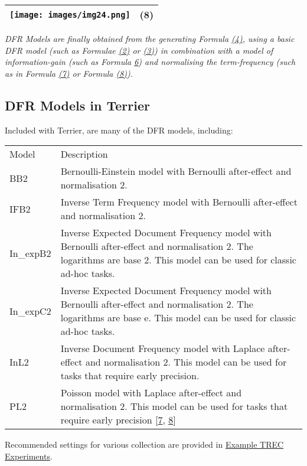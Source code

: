 \href{}{}

\begin{longtable}[]{@{}ll@{}}
\toprule
\texttt{[image: images/img24.png]} &
(8)\tabularnewline
\bottomrule
\end{longtable}

\emph{DFR Models are finally obtained from the generating Formula
\protect\hyperlink{Formula:DFR}{(4)}, using a basic DFR model (such as
Formulae \protect\hyperlink{Formula:binomial}{(2)} or
\protect\hyperlink{Formula:geometric}{(3)}) in combination with a model
of information-gain (such as Formula
\protect\hyperlink{Formula:riskLB}{6}) and normalising the
term-frequency (such as in Formula \protect\hyperlink{Formula:tfn}{(7)}
or Formula \protect\hyperlink{Furmula:tfn2}{(8)}).}

\href{}{}

\subsection{DFR Models in Terrier}\label{dfr-models-in-terrier}

Included with Terrier, are many of the DFR models, including:

\begin{longtable}[]{@{}ll@{}}
\toprule
Model & Description\tabularnewline
BB2 & Bernoulli-Einstein model with Bernoulli after-effect and
normalisation 2.\tabularnewline
IFB2 & Inverse Term Frequency model with Bernoulli after-effect and
normalisation 2.\tabularnewline
In\_expB2 & Inverse Expected Document Frequency model with Bernoulli
after-effect and normalisation 2. The logarithms are base 2. This model
can be used for classic ad-hoc tasks.\tabularnewline
In\_expC2 & Inverse Expected Document Frequency model with Bernoulli
after-effect and normalisation 2. The logarithms are base e. This model
can be used for classic ad-hoc tasks.\tabularnewline
InL2 & Inverse Document Frequency model with Laplace after-effect and
normalisation 2. This model can be used for tasks that require early
precision.\tabularnewline
PL2 & Poisson model with Laplace after-effect and normalisation 2. This
model can be used for tasks that require early precision
{[}\protect\hyperlink{7}{7}, \protect\hyperlink{8}{8}{]}\tabularnewline
\bottomrule
\end{longtable}

Recommended settings for various collection are provided in
\href{trec_examples.html\#paramsettings}{Example TREC Experiments}.

